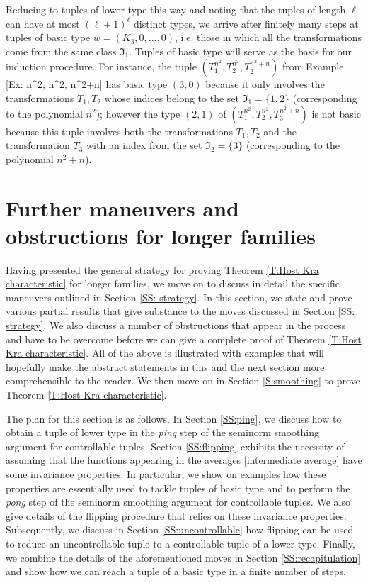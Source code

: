 \documentclass[11pt]{amsart}
\theoremstyle{definition}
\newcommand{\FI}{{\mathfrak I}}
\begin{document}
Reducing to tuples of lower type this way and noting that the tuples of length $\ell$ can have at most $(\ell+1)^\ell$ distinct types, we arrive after finitely many steps at tuples of basic type $w = (K_3, 0, \ldots, 0)$, i.e. those in which all the transformations come from the same class $\FI_1$. Tuples of basic type will serve as the basis for our induction procedure. For instance, the tuple $(T_1^{n^2}, T_2^{n^2}, T_2^{n^2+n})$ from Example \ref{Ex: n^2, n^2, n^2+n} has basic type $(3, 0)$ because it only involves the transformations $T_1, T_2$ whose indices belong to the set $\FI_1 = \{1, 2\}$ (corresponding to the polynomial $n^2$); however the type $(2, 1)$ of $(T_1^{n^2}, T_2^{n^2}, T_3^{n^2+n})$ is not basic because this tuple involves both the transformations $T_1, T_2$ and the transformation $T_3$ with an index from the set $\FI_2 = \{3\}$ (corresponding to the polynomial $n^2 + n$).






\section{Further maneuvers and obstructions for longer families}\label{S:maneuvers}
Having presented the general strategy for proving Theorem \ref{T:Host Kra characteristic} for longer families, we move on to discuss in detail the specific maneuvers outlined in Section \ref{SS: strategy}. In this section, we state and prove various partial results that give substance to the moves discussed in Section \ref{SS: strategy}. We also discuss a number of obstructions that appear in the process and have to be overcome before we can give a complete proof of Theorem \ref{T:Host Kra characteristic}. All of the above is illustrated with examples that will hopefully make the abstract statements in this and the next section more comprehensible to the reader. We then move on in Section \ref{S:smoothing} to prove Theorem \ref{T:Host Kra characteristic}.


The plan for this section is as follows. In Section \ref{SS:ping}, we discuss how to obtain a tuple of lower type in the \textit{ping} step of the seminorm smoothing argument for controllable tuples. Section \ref{SS:flipping} exhibits the necessity of assuming that the functions appearing in the averages \eqref{intermediate average} have some invariance properties. In particular, we show on examples how these properties are essentially used to tackle tuples of basic type and to perform the \textit{pong} step of the seminorm smoothing argument for controllable tuples. We also give details of the flipping procedure that relies on these invariance properties. Subsequently, we discuss in Section \ref{SS:uncontrollable} how flipping can be used to reduce an uncontrollable tuple to a controllable tuple of a lower type. Finally, we combine the details of the aforementioned moves in Section \ref{SS:recapitulation} and show how we can reach a tuple of a basic type in a finite number of steps.
\end{document}
